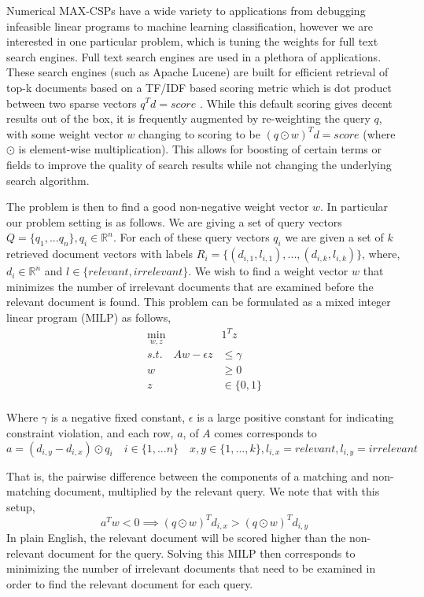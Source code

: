 \documentclass[a4paper]{article}
\begin{document}
Numerical MAX-CSPs have a wide variety to applications from debugging
infeasible linear programs to machine learning classification, however we are
interested in one particular problem, which is tuning the weights for
full text search engines.  Full text search engines are used in a plethora of
applications. These search engines (such as Apache Lucene) are built for
efficient retrieval of top-k documents based on a TF/IDF based scoring metric
which is dot product between two sparse vectors $q^Td =
score$\cite{lucene_history} \cite{WAND_paper} \cite{block_max_WAND_paper}.
While this default scoring gives decent results out of the box, it is
frequently augmented by re-weighting the query $q$, with some weight vector $w$
changing to scoring to be $(q\odot w)^Td = score$ (where $\odot$ is element-wise multiplication).
This allows for boosting of certain terms or fields to improve the quality of
search results while not changing the underlying search algorithm. 

The problem is then to find a good non-negative weight vector $w$. In particular our
problem setting is as follows. We are giving a set of query vectors $Q = \{q_1, ... q_n\}, q_i \in \mathds{R}^n$. For each 
of these query vectors $q_i$ we are given a set of $k$ retrieved document vectors with labels $R_i = \{(d_{i,1}, l_{i,1}), ..., (d_{i, k}, l_{i,k})\}$, 
where, $d_i \in \mathds{R}^n$ and $l \in \{relevant, irrelevant\}$.
We wish to find a weight vector $w$ that minimizes the number of irrelevant documents that are examined 
before the relevant document is found. This problem can be formulated as a mixed integer linear program (MILP) as follows,
\begin{align*}
\min_{w,z}\quad &1^Tz\\
s.t. \quad Aw - \epsilon z &\leq \gamma\\
		w &\geq 0\\
		z &\in \{0,1\}\\
\end{align*}

Where $\gamma$ is a negative fixed constant, $\epsilon$ is a large positive constant for 
indicating constraint violation, and each row, $a$, of $A$ comes corresponds to 
$$
a = (d_{i,y} - d_{i,x}) \odot q_i  \quad i \in \{1,...n\} \quad x,y \in \{1,...,k\}, l_{i,x} = relevant, l_{i,y} = irrelevant
$$

That is, the pairwise difference between the components of a matching and non-matching document, multiplied by the 
relevant query. We note that with this setup, 
$$
a^Tw < 0 \implies (q\odot w)^Td_{i,x} > (q\odot w)^Td_{i,y}
$$
In plain English, the relevant document will be scored higher than the
non-relevant document for the query. Solving this MILP then corresponds to
minimizing the number of irrelevant documents that need to be examined in order
to find the relevant document for each query. 
\end{document}
